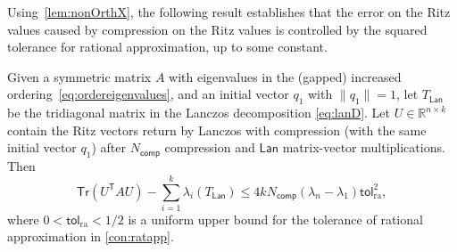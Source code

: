 \documentclass{siamart190516}
\newcommand{\Ttran}{\mathsf{T}}
\newcommand{\tol}{\mathsf{tol}}
\newcommand{\Tr}{\mathsf{Tr}}
\newcommand{\lan}{\mathsf{Lan}}
\newcommand{\compress}{N_\mathsf{comp}}
\newcommand{\R}{\mathbb{R}}
\providecommand{\norm}[1]{\lVert#1\rVert}
\begin{document}
Using~\cref{lem:nonOrthX}, the following result establishes that the error on the Ritz values caused by compression on the Ritz values is controlled by the squared tolerance for rational approximation, up to some constant.
\begin{theorem}
    \label{thmcon}
    Given a symmetric matrix $A$ with eigenvalues in 
    the (gapped) increased ordering~\eqref{eq:ordereigenvalues}, and an initial vector $q_{1}$ with $\norm{q_{1}}=1$, let $T_{\lan}$ be the tridiagonal matrix in the Lanczos decomposition \cref{eq:lanD}.
    Let $U\in\R^{n\times k}$ contain the Ritz vectors return by Lanczos with compression (with the same initial vector $q_{1}$) after $\compress$ compression and $\lan$ matrix-vector multiplications. Then  
    \begin{equation*}
        \Tr(U^{\Ttran}AU)-\sum_{i=1}^{k}\lambda_{i}(T_{\lan})\leq 4k\compress(\lambda_{n}-\lambda_{1})\tol_{\mathrm{ra}}^{2},
    \end{equation*}
    where $0<\tol_{\mathrm{ra}}< 1/2$ is a uniform upper bound for the tolerance of rational approximation in \cref{con:ratapp}.
\end{theorem}
\end{document}
